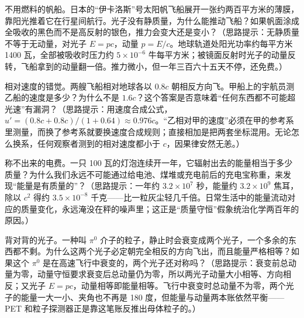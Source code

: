 \begin{puzzles}
\item 不用燃料的帆船。日本的“伊卡洛斯”号太阳帆飞船展开一张约两百平方米的薄膜，靠阳光推着它在行星间航行。光子没有静质量，为什么能推动飞船？如果帆面涂成全吸收的黑色而不是高反射的银色，推力会变大还是变小？（思路提示：无静质量不等于无动量，对光子 \(E=pc\)，动量 \(p=E/c\)。地球轨道处阳光功率约每平方米 1400 瓦，全部被吸收时压力约 \(5\times10^{-6}\) 牛每平方米；被镜面反射时光子的动量反转，飞船拿到的动量翻一倍。推力微小，但一年三百六十五天不停，还免费。）
\item 相对速度的错觉。两艘飞船相对地球各以 \(0.8c\) 朝相反方向飞。甲船上的宇航员测乙船的速度是多少？为什么不是 \(1.6c\)？这个答案是否意味着“任何东西都不可能超光速”有漏洞？（思路提示：用速度合成公式，\(u'=(0.8c+0.8c)/(1+0.64)\approx0.976c\)。“乙相对甲的速度”必须在甲的参考系里测量，而换了参考系就要换速度合成规则；直接相加是把两套坐标混用。无论怎么换系，任何观察者测到的相对速度都小于 \(c\)，因果律安然无恙。）
\item 称不出来的电费。一只 100 瓦的灯泡连续开一年，它辐射出去的能量相当于多少质量？为什么我们永远不可能通过给电池、煤堆或充电前后的充电宝称重，来发现“能量是有质量的”？（思路提示：一年约 \(3.2\times10^{7}\) 秒，能量约 \(3.2\times10^{9}\) 焦耳，除以 \(c^{2}\) 得约 \(3.5\times10^{-8}\) 千克——比一粒灰尘轻几千倍。日常生活中的能量流动对应的质量变化，永远淹没在秤的噪声里；这正是“质量守恒”假象统治化学两百年的原因。）
\item 背对背的光子。一种叫 \(\pi^{0}\) 介子的粒子，静止时会衰变成两个光子，一个多余的东西都不剩。为什么这两个光子必定朝完全相反的方向飞出，而且能量严格相等？如果这个 \(\pi^{0}\) 是在高速飞行中衰变的，两个光子还对称吗？（思路提示：衰变前总动量为零，动量守恒要求衰变后总动量仍为零，所以两光子动量大小相等、方向相反；又光子 \(E=pc\)，动量相等即能量相等。飞行中衰变时总动量不为零，两个光子的能量一大一小、夹角也不再是 180 度，但能量与动量两本账依然平衡——PET 和粒子探测器正是靠这笔账反推出母体粒子的。）
\end{puzzles}
